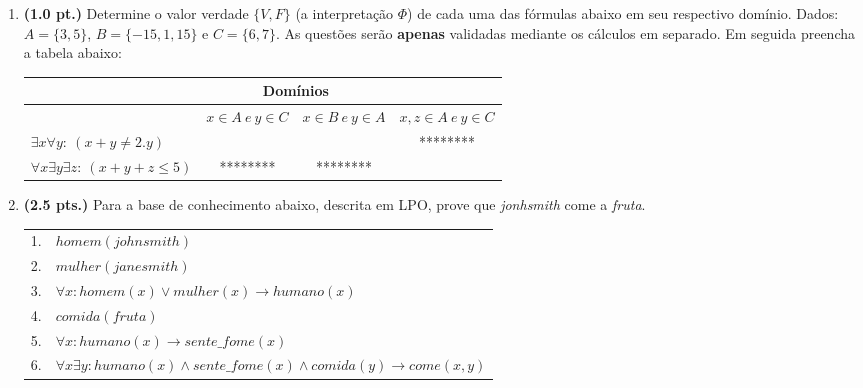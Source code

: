 \documentclass[a4paper,11pt]{article}
\begin{document}
\begin{enumerate}
\setlength{\itemsep}{13pt}


\item {\bf (1.0 pt.)} Determine o valor verdade $\{V, F \}$ (a interpretação $\Phi $)
de cada uma das fórmulas abaixo em seu respectivo domínio. Dados: $A = \{ 3,  5 \}$, $B = \{ -15, 1, 15\}$ e  $C = \{ 6,  7 \}$.
As questões serão \textbf{apenas} validadas mediante os cálculos em separado.
 Em seguida preencha a tabela abaixo:

\begin{center}
\begin{tabular}{l|c|c|c} \hline \hline
 & \multicolumn{2}{c}{Domínios} \\ \hline \hline
 & $x \in A ~e~ y \in C$ & $x \in B ~e~ y \in A$ & $x,z \in A ~e~ y \in C$  \\ \hline

$\exists x \forall y: ~ (x+y \neq 2.y)$ &  &  & ******** \\ \hline
$\forall x \exists y \exists z: ~ (x+y+z \leq 5)$ & ******** & ******** &   \\ \hline \hline
\end{tabular}

\end{center}



\item \label{P1} {\bf (2.5 pts.)} Para a base de conhecimento abaixo, descrita em LPO, prove que {\em jonhsmith} come a {\em fruta}.

\vspace{-0.5cm}

\begin{tabular}{ll}
\\  \hline \hline
  1. & $homem(johnsmith)$ \\
  2. & $mulher(janesmith)$ \\
  3. & $\forall x: homem(x) \vee mulher(x) \rightarrow humano(x)$ \\
  4. & $comida(fruta)$ \\
  5. & $\forall x: humano(x) \rightarrow sente\_fome(x)$ \\
  6. & $\forall x \exists y: humano(x) \wedge sente\_fome(x) \wedge comida(y) \rightarrow come(x,y)$ \\
    \hline \hline
 \end{tabular}
 

\end{enumerate}
\end{document}
